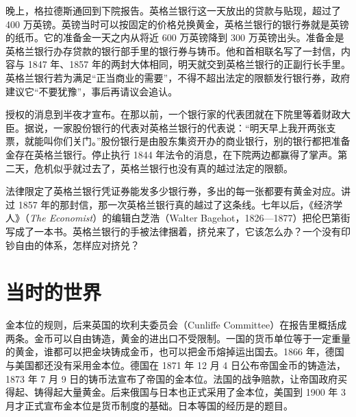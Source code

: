 晚上，格拉德斯通回到下院报告。英格兰银行这一天放出的贷款与贴现，超过了 400 万英镑\cite{hansard1866}。英镑当时可以按固定的价格兑换黄金，英格兰银行的银行券就是英镑的纸币。它的准备金一天之内从将近 600 万英镑降到 300 万英镑出头\cite{hansard1866}。准备金是英格兰银行办存贷款的银行部手里的银行券与铸币。他和首相联名写了一封信，内容与 1847 年、1857 年的两封大体相同，明天就交到英格兰银行的正副行长手里\cite{hansard1866}。英格兰银行若为满足“正当商业的需要”，不得不超出法定的限额发行银行券，政府建议它“不要犹豫”，事后再请议会追认\cite{hansard1866}。

授权的消息到半夜才宣布。在那以前，一个银行家的代表团就在下院里等着财政大臣\cite{andreades1909}。据说，一家股份银行的代表对英格兰银行的代表说：“明天早上我开两张支票，就能叫你们关门。”\cite{andreades1909}股份银行是由股东集资开办的商业银行，别的银行都把准备金存在英格兰银行\cite{bagehot1873}。停止执行 1844 年法令的消息，在下院两边都赢得了掌声。第二天，危机似乎就过去了，英格兰银行也没有真的越过法定的限额\cite{andreades1909}。

法律限定了英格兰银行凭证券能发多少银行券，多出的每一张都要有黄金对应。讲过 1857 年的那封信，那一次英格兰银行真的越过了这条线。七年以后，《经济学人》（\emph{The Economist}）的编辑白芝浩（Walter Bagehot，1826—1877）把伦巴第街写成了一本书\cite{bordo1984,bagehot1873}。英格兰银行的手被法律捆着，挤兑来了，它该怎么办？一个没有印钞自由的体系，怎样应对挤兑？

\section{当时的世界}\label{sec:gold-world}

金本位的规则，后来英国的坎利夫委员会（Cunliffe Committee）在报告里概括成两条。金币可以自由铸造，黄金的进出口不受限制\cite{bordo1984}。一国的货币单位等于一定重量的黄金，谁都可以把金块铸成金币，也可以把金币熔掉运出国去。1866 年，德国与美国都还没有采用金本位。德国在 1871 年 12 月 4 日公布帝国金币的铸造法，1873 年 7 月 9 日的铸币法宣布了帝国的金本位\cite{reichsbank1910}。法国的战争赔款，让帝国政府买得起、铸得起大量黄金\cite{reichsbank1910}。后来俄国与日本也正式采用了金本位，美国到 1900 年 3 月才正式宣布金本位是货币制度的基础\cite{reichsbank1910}。日本等国的经历是的题目。

